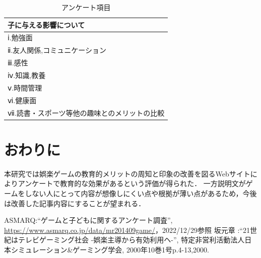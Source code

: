 \documentclass[twocolumn,10pt,a4j]{ltjsarticle}
\begin{document}
\begin{table}[h]
 \caption{アンケート項目}
 \label{table:anque}
 \small
 \centering
  \begin{tabular}{l}
  \hline
  子に与える影響について \\
  \hline
   ⅰ.勉強面 \\
   ⅱ.友人関係,コミュニケーション\\
   ⅲ.感性\\
   ⅳ.知識,教養 \\
   ⅴ.時間管理   \\
   ⅵ.健康面 \\
   ⅶ.読書・スポーツ等他の趣味とのメリットの比較 \\
   \hline
  \end{tabular}
\end{table}




\section{おわりに}
本研究では娯楽ゲームの教育的メリットの周知と印象の改善を図るWebサイトによりアンケートで教育的な効果があるという評価が得られた．
一方説明文がゲームをしない人にとって内容が想像しにくい点や根拠が薄い点があるため，今後は改善した記事内容にすることが望まれる．

\begin{thebibliography}{99}
 ASMARQ:``ゲームと子どもに関するアンケート調査'', \url{https://www.asmarq.co.jp/data/mr201409game/}，2022/12/29参照
 坂元章 :``21世紀はテレビゲーミング社会 -娯楽主導から有効利用ヘ-'', 特定非営利活動法人日本シミュレーション\&ゲーミング学会, 2000年10巻1号p.4-13,2000.
\end{thebibliography}
\end{document}
